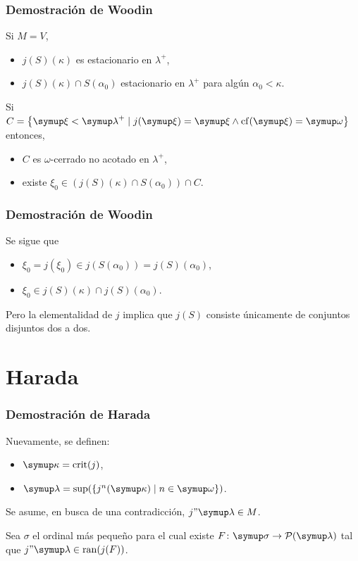 \documentclass{beamer}
\begin{document}
\begin{frame}
    \frametitle{Demostración de Woodin}
    Si $M=V$,
    \pause
    \begin{itemize}
        \item $j(S)(\kappa)$ es estacionario en $\lambda^+$,
        \item $j(S)(\kappa)\cap S(\alpha_0)$ estacionario en $\lambda^+$
            para algún $\alpha_0<\kappa$.
    \end{itemize}

    \pause
    Si $C = \set{\xi<\lambda^+\mid j(\xi)=\xi \land \cf(\xi)=\omega}$
    entonces,
    \pause
    \begin{itemize}
        \item $C$ es $\omega$-cerrado no acotado en $\lambda^+$,
        \item existe $\xi_0\in (j(S)(\kappa)\cap S(\alpha_0))\cap C$.
    \end{itemize}
\end{frame}

\begin{frame}
    \frametitle{Demostración de Woodin}

    Se sigue que
    \begin{itemize}
        \item $\xi_0 = j(\xi_0)\in j(S(\alpha_0)) = j(S)(\alpha_0)$,
        \item $\xi_0\in j(S)(\kappa)\cap j(S)(\alpha_0)$.
    \end{itemize}

    Pero la elementalidad de $j$ implica que $j(S)$ consiste únicamente de conjuntos
    disjuntos dos a dos.
\end{frame}

\section{Harada}

\begin{frame}
    \frametitle{Demostración de Harada}

    Nuevamente, se definen:
    \begin{itemize}
        \item $\kappa=\crit{j}$,
        \item $\lambda=\sup(\set{j^n(\kappa)\mid n\in\omega})$.
    \end{itemize}

    \pause
    Se asume, en busca de una contradicción, $j"\lambda\in M$.

    \pause
    Sea $\sigma$ el ordinal más pequeño para el cual existe
    $F\colon\sigma\to\pwset{\lambda}$ tal que
    $j"\lambda\in\ran(j(F))$.
\end{frame}
\end{document}
